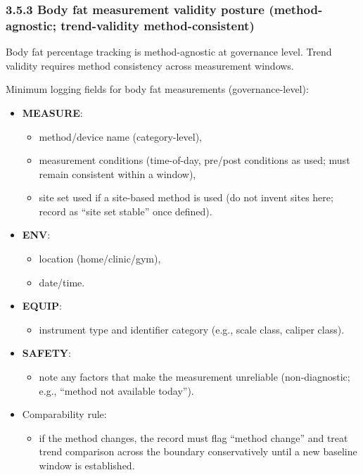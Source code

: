 \documentclass[10pt]{article}
\begin{document}
\subsubsection*{3.5.3 Body fat measurement validity posture (method-agnostic; trend-validity method-consistent)}

Body fat percentage tracking is method-agnostic at governance level. Trend validity requires method consistency across measurement windows.

Minimum logging fields for body fat measurements (governance-level):

\begin{itemize}
\item \textbf{MEASURE}:
  \begin{itemize}
  \item method/device name (category-level),
  \item measurement conditions (time-of-day, pre/post conditions as used; must remain consistent within a window),
  \item site set used if a site-based method is used (do not invent sites here; record as “site set stable” once defined).
  \end{itemize}
\item \textbf{ENV}:
  \begin{itemize}
  \item location (home/clinic/gym),
  \item date/time.
  \end{itemize}
\item \textbf{EQUIP}:
  \begin{itemize}
  \item instrument type and identifier category (e.g., scale class, caliper class).
  \end{itemize}
\item \textbf{SAFETY}:
  \begin{itemize}
  \item note any factors that make the measurement unreliable (non-diagnostic; e.g., “method not available today”).
  \end{itemize}
\item Comparability rule:
  \begin{itemize}
  \item if the method changes, the record must flag “method change” and treat trend comparison across the boundary conservatively until a new baseline window is established.
  \end{itemize}
\end{itemize}
\end{document}
